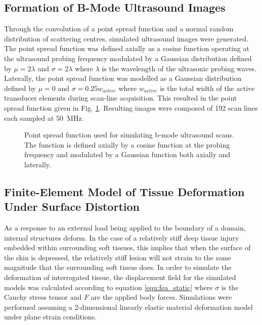 		\subsection{Formation of B-Mode Ultrasound Images}
			Through the convolution of a point spread function and a normal random distribution of scattering centres, simulated ultrasound images were generated. The point spread function was defined axially as a cosine function operating at the ultrasound probing frequency modulated by a Gaussian distribution defined by $\mu = 2\lambda$ and $\sigma = 2\lambda$ where $\lambda$ is the wavelength of the ultrasonic probing waves. Laterally, the point spread function was modelled as a Gaussian distribution defined by $\mu = 0$ and $\sigma = 0.25w_{active}$ where $w_{active}$ is the total width of the active transducer elements during scan-line acquisition.  This resulted in the point spread function given in Fig. \ref{fig:point_spread_function}. Resulting images were composed of 192 scan lines each sampled at \SI{50}{\MHz}.

			\begin{figure}[!htb]
				\centering
				\caption[Point spread function used for simulating b-mode ultrasound scans]{Point spread function used for simulating b-mode ultrasound scans. The function is defined axially by a cosine function at the probing frequency and modulated by a Gaussian function both axially and laterally.}
				\label{fig:point_spread_function}
			\end{figure}

		\subsection{Finite-Element Model of Tissue Deformation Under Surface Distortion}
			As a response to an external load being applied to the boundary of a domain, internal structures deform. In the case of a relatively stiff deep tissue injury embedded within surrounding soft tissues, this implies that when the surface of the skin is depressed, the relatively stiff lesion will not strain to the same magnitude that the surrounding soft tissue does. In order to simulate the deformation of interrogated tissue, the displacement field for the simulated models was calculated according to equation \ref{equ:fea_static} where $\sigma$ is the Cauchy stress tensor and $F$ are the applied body forces. Simulations were performed assuming a 2-dimensional linearly elastic material deformation model under plane strain conditions.

